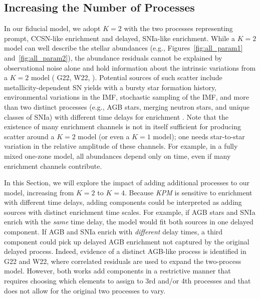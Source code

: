 \documentclass[modern, linenumbers]{aastex631}
\newcommand{\name}{\textsl{KPM}}
\begin{document}
\subsection{Increasing the Number of Processes} \label{subsec:k=4}

In our fiducial model, we adopt $K=2$ with the two processes representing prompt, CCSN-like enrichment and delayed, SNIa-like enrichment. While a $K=2$ model can well describe the stellar abundances (e.g., Figures~\ref{fig:all_param1} and~\ref{fig:all_param2}), the abundance residuals cannot be explained by observational noise alone and hold information about the intrinsic variations from a $K=2$ model (\citealp{ness2019} G22, W22, \citealp{ting2022, ratcliffe2023}). Potential sources of such scatter include metallicity-dependent SN yields with a bursty star formation history, environmental variations in the IMF, stochastic sampling of the IMF, and more than two distinct processes (e.g., AGB stars, merging neutron stars, and unique classes of SNIa) with different time delays for enrichment \citep[e.g.][]{belokurov2022, griffith2023}. Note that the existence of many enrichment channels is not in itself sufficient for producing scatter around a $K=2$ model (or even a $K=1$ model); one needs star-to-star variation in the relative amplitude of these channels. For example, in a fully mixed one-zone model, all abundances depend only on time, even if many enrichment channels contribute.

In this Section, we will explore the impact of adding additional processes to our model, increasing from $K=2$ to $K=4$. Because \name{} is sensitive to enrichment with different time delays, adding components could be interpreted as adding sources with distinct enrichment time scales. For example, if AGB stars and SNIa enrich with the \textit{same} time delay, the model would fit both sources in one delayed component. If AGB and SNIa enrich with \textit{different} delay times, a third component could pick up delayed AGB enrichment not captured by the original delayed process. Indeed, evidence of a distinct AGB-like process is identified in G22 and W22, where correlated residuals are used to expand the two-process model. However, both works add components in a restrictive manner that requires choosing which elements to assign to 3rd and/or 4th processes and that does not allow for the original two processes to vary. 
\end{document}
